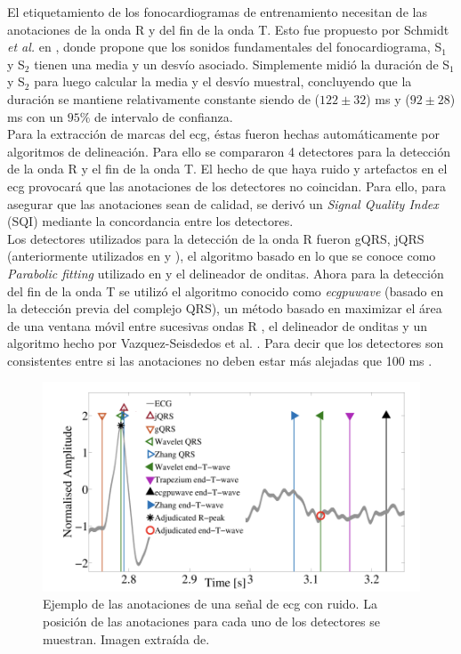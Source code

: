\indent El etiquetamiento de los fonocardiogramas de entrenamiento necesitan de las anotaciones de la onda R y del
fin de la onda T. Esto fue propuesto por Schmidt \textit{et al.} en \cite{pp:schmidt2010}, donde propone que los
sonidos fundamentales del fonocardiograma, S$_1$ y S$_2$ tienen una media y un desvío asociado. Simplemente midió la
duración de S$_1$ y S$_2$ para luego calcular la media y el desvío muestral, concluyendo que la duración se mantiene
relativamente constante siendo de ($122 \pm 32$) ms y ($92 \pm 28$) ms con un $95\%$ de intervalo de confianza. \\
\indent Para la extracción de marcas del \acrshort{ecg}, éstas fueron hechas automáticamente por algoritmos de
delineación. Para ello se compararon 4 detectores para la detección de la onda R y el fin de la onda T. El hecho de
que haya ruido y artefactos en el \acrshort{ecg} provocará que las anotaciones de los detectores no coincidan. Para
ello, para asegurar que las anotaciones sean de calidad, se derivó un \textit{Signal Quality Index} (SQI) mediante
la concordancia entre los detectores. \\
\indent Los detectores utilizados para la detección de la onda R fueron gQRS, jQRS (anteriormente utilizados en
\cite{ref:behar} y \cite{ref:behar-oster-clifford}), el algoritmo basado en lo que se conoce como \textit{Parabolic
fitting} utilizado en \cite{ref:illanes-zhang} y el delineador de onditas. Ahora para la detección del fin de la
onda T se utilizó el algoritmo conocido como \textit{ecgpuwave} (basado en la detección previa del complejo QRS), un
método basado en maximizar el área de una ventana móvil entre sucesivas ondas R \cite{ref:zhang}, el delineador de
onditas y un algoritmo hecho por Vazquez-Seisdedos et al. \cite{ref:seisdedos}. Para decir que los detectores son
consistentes entre si las anotaciones no deben estar más alejadas que 100 ms \cite{pp:springer2015}.

\begin{figure}[H]
  \centering
  \includegraphics[scale=0.8]{sections/chapter-04/images/detector-agreement.png}
  \caption[
    Ejemplo de las anotaciones de una señal de \acrshort{ecg} con ruido.
    La posición de las anotaciones para cada uno de los detectores se muestran
  ]
  {
    Ejemplo de las anotaciones de una señal de \acrshort{ecg} con ruido.
    La posición de las anotaciones para cada uno de los detectores se muestran.
    Imagen extraída de\cite{pp:springer2015}.
  }
  \label{fig:detector-agreement}
\end{figure}

